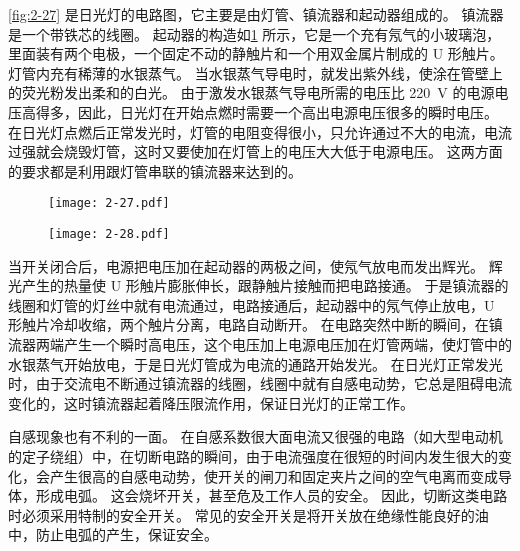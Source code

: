 \cref{fig:2-27} 是日光灯的电路图，它主要是由灯管、镇流器和起动器组成的。
镇流器是一个带铁芯的线圈。
起动器的构造如\cref{fig:2-28} 所示，它是一个充有氖气的小玻璃泡，里面装有两个电极，一个固定不动的静触片和一个用双金属片制成的 U 形触片。
灯管内充有稀薄的水银蒸气。
当水银蒸气导电时，就发出紫外线，使涂在管壁上的荧光粉发出柔和的白光。
由于激发水银蒸气导电所需的电压比 \qty{220}{V} 的电源电压高得多，因此，日光灯在开始点燃时需要一个高出电源电压很多的瞬时电压。
在日光灯点燃后正常发光时，灯管的电阻变得很小，只允许通过不大的电流，电流过强就会烧毁灯管，这时又要使加在灯管上的电压大大低于电源电压。
这两方面的要求都是利用跟灯管串联的镇流器来达到的。
\begin{figure}
	\begin{minipage}[b]{0.48\linewidth}\centering
		\texttt{[image: 2-27.pdf]}
		\caption{}\label{fig:2-27}
	\end{minipage}
	\begin{minipage}[b]{0.48\linewidth}\centering
		\texttt{[image: 2-28.pdf]}
		\caption{}\label{fig:2-28}
	\end{minipage}
\end{figure}

当开关闭合后，电源把电压加在起动器的两极之间，使氖气放电而发出辉光。
辉光产生的热量使 U 形触片膨胀伸长，跟静触片接触而把电路接通。
于是镇流器的线圈和灯管的灯丝中就有电流通过，电路接通后，起动器中的氖气停止放电，U 形触片冷却收缩，两个触片分离，电路自动断开。
在电路突然中断的瞬间，在镇流器两端产生一个瞬时高电压，这个电压加上电源电压加在灯管两端，使灯管中的水银蒸气开始放电，于是日光灯管成为电流的通路开始发光。
在日光灯正常发光时，由于交流电不断通过镇流器的线圈，线圈中就有自感电动势，它总是阻碍电流变化的，这时镇流器起着降压限流作用，保证日光灯的正常工作。

自感现象也有不利的一面。
在自感系数很大面电流又很强的电路（如大型电动机的定子绕组）中，在切断电路的瞬间，由于电流强度在很短的时间内发生很大的变化，会产生很高的自感电动势，使开关的闸刀和固定夹片之间的空气电离而变成导体，形成电弧。
这会烧坏开关，甚至危及工作人员的安全。
因此，切断这类电路时必须采用特制的安全开关。
常见的安全开关是将开关放在绝缘性能良好的油中，防止电弧的产生，保证安全。

